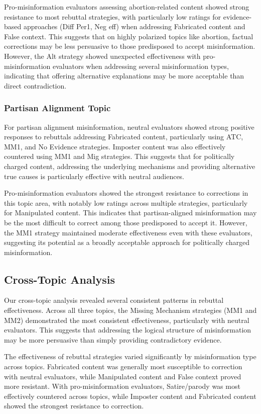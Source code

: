 \documentclass[twocolumn]{article}
\begin{document}
Pro-misinformation evaluators assessing abortion-related content showed strong resistance to most rebuttal strategies, with particularly low ratings for evidence-based approaches (Diff Per1, Neg eff) when addressing Fabricated content and False context. This suggests that on highly polarized topics like abortion, factual corrections may be less persuasive to those predisposed to accept misinformation. However, the Alt strategy showed unexpected effectiveness with pro-misinformation evaluators when addressing several misinformation types, indicating that offering alternative explanations may be more acceptable than direct contradiction.

\subsubsection{Partisan Alignment Topic}
For partisan alignment misinformation, neutral evaluators showed strong positive responses to rebuttals addressing Fabricated content, particularly using ATC, MM1, and No Evidence strategies. Imposter content was also effectively countered using MM1 and Mig strategies. This suggests that for politically charged content, addressing the underlying mechanisms and providing alternative true causes is particularly effective with neutral audiences.

Pro-misinformation evaluators showed the strongest resistance to corrections in this topic area, with notably low ratings across multiple strategies, particularly for Manipulated content. This indicates that partisan-aligned misinformation may be the most difficult to correct among those predisposed to accept it. However, the MM1 strategy maintained moderate effectiveness even with these evaluators, suggesting its potential as a broadly acceptable approach for politically charged misinformation.

\subsection{Cross-Topic Analysis}

Our cross-topic analysis revealed several consistent patterns in rebuttal effectiveness. Across all three topics, the Missing Mechanism strategies (MM1 and MM2) demonstrated the most consistent effectiveness, particularly with neutral evaluators. This suggests that addressing the logical structure of misinformation may be more persuasive than simply providing contradictory evidence.

The effectiveness of rebuttal strategies varied significantly by misinformation type across topics. Fabricated content was generally most susceptible to correction with neutral evaluators, while Manipulated content and False context proved more resistant. With pro-misinformation evaluators, Satire/parody was most effectively countered across topics, while Imposter content and Fabricated content showed the strongest resistance to correction.
\end{document}

